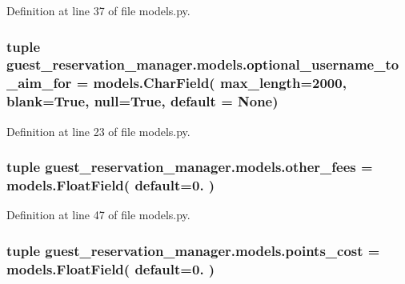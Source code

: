 Definition at line 37 of file models.\-py.

\hypertarget{namespaceguest__reservation__manager_1_1models_a1d499a99f73d12d35190ca4c8283a401}{
\subsubsection[{optional\-\_\-username\-\_\-to\-\_\-aim\-\_\-for}]{\setlength{\rightskip}{0pt plus 5cm}tuple guest\-\_\-reservation\-\_\-manager.\-models.\-optional\-\_\-username\-\_\-to\-\_\-aim\-\_\-for = models.\-Char\-Field( max\-\_\-length=2000, blank=True, null=True, default = None)}}\label{namespaceguest__reservation__manager_1_1models_a1d499a99f73d12d35190ca4c8283a401}


Definition at line 23 of file models.\-py.

\hypertarget{namespaceguest__reservation__manager_1_1models_a6b16e65df2efd31483294d10f9be1b39}{
\subsubsection[{other\-\_\-fees}]{\setlength{\rightskip}{0pt plus 5cm}tuple guest\-\_\-reservation\-\_\-manager.\-models.\-other\-\_\-fees = models.\-Float\-Field( default=0. )}}\label{namespaceguest__reservation__manager_1_1models_a6b16e65df2efd31483294d10f9be1b39}


Definition at line 47 of file models.\-py.

\hypertarget{namespaceguest__reservation__manager_1_1models_a1e31ad7cbb3612f6bff704e1f9929ac7}{
\subsubsection[{points\-\_\-cost}]{\setlength{\rightskip}{0pt plus 5cm}tuple guest\-\_\-reservation\-\_\-manager.\-models.\-points\-\_\-cost = models.\-Float\-Field( default=0. )}}\label{namespaceguest__reservation__manager_1_1models_a1e31ad7cbb3612f6bff704e1f9929ac7}


